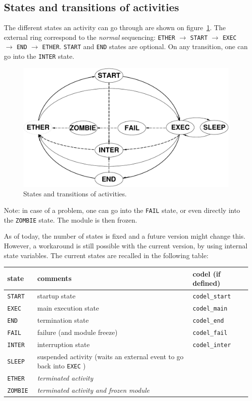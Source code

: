 \subsection{States and transitions of activities}

The   different  states   an  activity can   go   through  are  shown  on
figure~\ref{fig|states}. The external ring correspond to the \emph{normal}
sequencing: \texttt{ETHER} $\rightarrow$   \texttt{START} $\rightarrow$   
\texttt{EXEC} $\rightarrow$ \texttt{END}  $\rightarrow$ \texttt{ETHER}. \texttt{START} and
\texttt{END}  states are optional.   On any transition, one  can go into the
\texttt{INTER} state.

\begin{figure}[htbp]
\centering
\includegraphics[width=0.8\hsize]{fig/activity-states}
\caption{States and transitions of activities.}
\label{fig|states}
\end{figure}

Note: in case of a problem, one can go into the \texttt{FAIL} state, or even
directly into the \texttt{ZOMBIE} state. The module is then frozen.

As of today, the  number of states is fixed  and  a future version  might
change this.  However, a workaround  is  still possible with the  current
version, by using internal   state   variables. The current  states   are
recalled in the following table:

\bigbreak

{\small\begin{tabularx}{0.8\linewidth}{|l||X|l|}
\hline
state 	& comments 	& codel (if defined)	  \\
\hline
\tt START  & startup state 
		& \tt codel\_start 	\\
\tt EXEC   & main execution state & \tt codel\_main  \\
\tt END    & termination state 	& \tt codel\_end \\
\tt FAIL   & failure (and module freeze) \em 
					& \tt codel\_fail \\
\hline
\tt INTER  & interruption state 
					& \tt codel\_inter  \\
\hline
\tt SLEEP     	&  suspended activity (waits an external event to go back
into  \texttt{EXEC} ) & \\
\tt ETHER    	& \em terminated activity  & \\
\tt ZOMBIE   	& \em terminated activity and frozen module & \\
\hline
\end{tabularx}}

